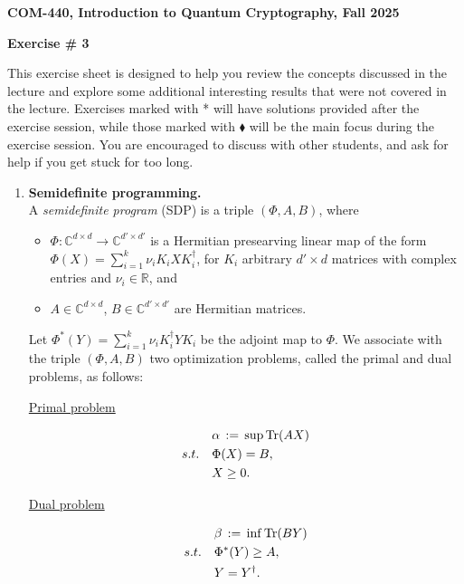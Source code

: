 \documentclass[12pt]{article}
\newcommand{\header}[1]{\begin{center} {\large\bf #1} \end{center}}
\begin{document}
\header{COM-440, Introduction to Quantum Cryptography, Fall 2025}
\header{\bf Exercise \# 3}

This exercise sheet is designed to help you review the concepts discussed in the lecture and explore some additional interesting results that were not covered in the lecture. Exercises marked with * will have solutions provided after the exercise session, while those marked with $\blacklozenge$ will be the main focus during the exercise session. You are encouraged to discuss with other students, and ask for help if you get stuck for too long.

\begin{enumerate}

\item  \textbf{Semidefinite programming.}\\
A \emph{semidefinite program} (SDP) is a triple $(\Phi,A,B)$, where
\begin{itemize}
\item $\Phi: \mathbb{C}^{d \times d}\to \mathbb{C}^{d' \times d'}$ is a Hermitian presearving linear map of the form $\Phi(X) = \sum_{i=1}^k \nu_i K_i X K_i^\dagger$, for $K_i$ arbitrary $d'\times d$ matrices with complex entries and $\nu_i \in \mathbb{R}$, and
\item $A \in \mathbb{C}^{d \times d}$, $B\in \mathbb{C}^{d' \times d'}$ are Hermitian matrices.
\end{itemize}
Let $\Phi^*(Y) = \sum_{i=1}^k \nu_i K_i^\dagger Y K_i$ be the adjoint map to $\Phi$. 
We associate with the triple $(\Phi, A, B)$ two optimization problems, called the primal and dual problems, as follows:
\begin{center}
  \begin{minipage}{2.5in}
 \centerline{\underline{Primal problem}}\vskip-4mm
\begin{align}
&\alpha\,:=\,  \sup \mathrm{Tr}(AX)\notag \\
s.t.\quad& \Phi(X)=B,\notag \\
& X \geq 0.\notag
\end{align}
  \end{minipage}
  \hspace*{13mm}
  \begin{minipage}{2.5in}
 \centerline{\underline{Dual problem}}\vskip-4mm
\begin{align}
&\beta\,:=\,  \inf \mathrm{Tr}(BY) \notag\\
s.t.\quad&  \Phi^*(Y)\geq A,\notag\\
\qquad &Y=Y^\dagger.\notag
\end{align}

\end{minipage}
\end{center}
\end{enumerate}
\end{document}
